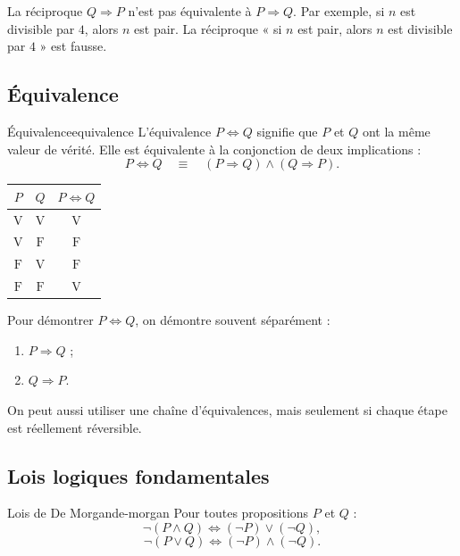 \documentclass[11pt,a4paper]{article}
\newcommand{\V}{\mathrm{V}}
\newcommand{\F}{\mathrm{F}}
\begin{document}
\begin{erreurbox}
La réciproque $Q\Rightarrow P$ n'est pas équivalente à $P\Rightarrow Q$. Par exemple, si $n$ est divisible par $4$, alors $n$ est pair. La réciproque « si $n$ est pair, alors $n$ est divisible par $4$ » est fausse.
\end{erreurbox}

\subsection{Équivalence}

\begin{definitionbox}{Équivalence}{equivalence}
L'équivalence $P\Longleftrightarrow Q$ signifie que $P$ et $Q$ ont la même valeur de vérité. Elle est équivalente à la conjonction de deux implications :
\[
P\Longleftrightarrow Q \quad\equiv\quad (P\Rightarrow Q)\land(Q\Rightarrow P).
\]
\end{definitionbox}

\begin{center}
\begin{tabular}{c|c|c}
$P$ & $Q$ & $P\Longleftrightarrow Q$ \\
\hline
$\V$ & $\V$ & $\V$ \\
$\V$ & $\F$ & $\F$ \\
$\F$ & $\V$ & $\F$ \\
$\F$ & $\F$ & $\V$
\end{tabular}
\end{center}

\begin{methodebox}
Pour démontrer $P\Longleftrightarrow Q$, on démontre souvent séparément :
\begin{enumerate}
  \item $P\Rightarrow Q$ ;
  \item $Q\Rightarrow P$.
\end{enumerate}
On peut aussi utiliser une chaîne d'équivalences, mais seulement si chaque étape est réellement réversible.
\end{methodebox}

\subsection{Lois logiques fondamentales}

\begin{propositionbox}{Lois de De Morgan}{de-morgan}
Pour toutes propositions $P$ et $Q$ :
\[
\neg(P\land Q)\Longleftrightarrow (\neg P)\lor(\neg Q),
\]
\[
\neg(P\lor Q)\Longleftrightarrow (\neg P)\land(\neg Q).
\]
\end{propositionbox}
\end{document}
